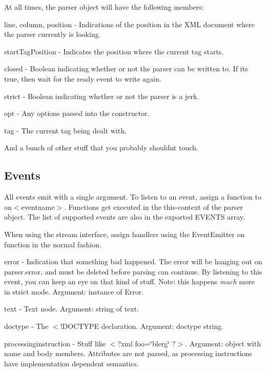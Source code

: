 At all times, the parser object will have the following members\+:

{\ttfamily line}, {\ttfamily column}, {\ttfamily position} -\/ Indications of the position in the X\+ML document where the parser currently is looking.

{\ttfamily start\+Tag\+Position} -\/ Indicates the position where the current tag starts.

{\ttfamily closed} -\/ Boolean indicating whether or not the parser can be written to. If it\textquotesingle{}s {\ttfamily true}, then wait for the {\ttfamily ready} event to write again.

{\ttfamily strict} -\/ Boolean indicating whether or not the parser is a jerk.

{\ttfamily opt} -\/ Any options passed into the constructor.

{\ttfamily tag} -\/ The current tag being dealt with.

And a bunch of other stuff that you probably shouldn\textquotesingle{}t touch.

\subsection*{Events}

All events emit with a single argument. To listen to an event, assign a function to {\ttfamily on$<$eventname$>$}. Functions get executed in the this-\/context of the parser object. The list of supported events are also in the exported {\ttfamily E\+V\+E\+N\+TS} array.

When using the stream interface, assign handlers using the Event\+Emitter {\ttfamily on} function in the normal fashion.

{\ttfamily error} -\/ Indication that something bad happened. The error will be hanging out on {\ttfamily parser.\+error}, and must be deleted before parsing can continue. By listening to this event, you can keep an eye on that kind of stuff. Note\+: this happens {\itshape much} more in strict mode. Argument\+: instance of {\ttfamily Error}.

{\ttfamily text} -\/ Text node. Argument\+: string of text.

{\ttfamily doctype} -\/ The {\ttfamily $<$!\+D\+O\+C\+T\+Y\+PE} declaration. Argument\+: doctype string.

{\ttfamily processinginstruction} -\/ Stuff like {\ttfamily $<$?xml foo=\char`\"{}blerg\char`\"{} ?$>$}. Argument\+: object with {\ttfamily name} and {\ttfamily body} members. Attributes are not parsed, as processing instructions have implementation dependent semantics.

